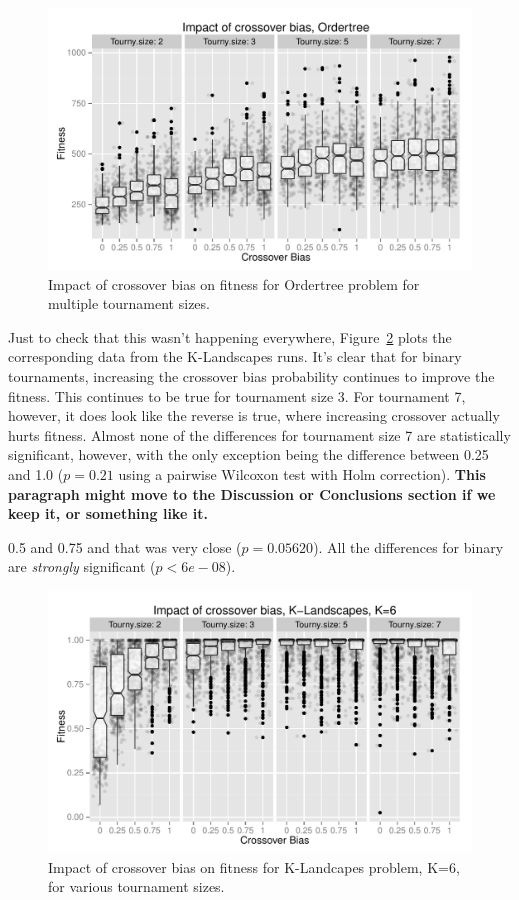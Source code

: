 \documentclass{sig-alternate}
\begin{document}
\begin{figure}
\centering
\includegraphics[width=0.45 \textwidth]{Plots/Ordertree_results_all_tournaments_Jan15.pdf}
\caption{Impact of crossover bias on fitness for Ordertree problem for multiple tournament sizes.}
\label{fig:Ordertree_results_all_tournaments_Jan15}
\end{figure}

Just to check that this wasn't happening everywhere, Figure~\ref{fig:KLandscapes6_XO_bias_impact_facets} plots 
the corresponding data from the K-Landscapes runs. It's clear that for binary tournaments, increasing the crossover 
bias probability continues to improve the fitness. This continues to be true for tournament size 3. For tournament 7, 
however, it does look like the reverse is true, where increasing crossover actually hurts fitness. Almost none of the 
differences for tournament size 7 are statistically significant, however, with the only exception being the difference 
between 0.25 and 1.0 ($p=0.21$ using a pairwise Wilcoxon test with Holm correction). \textbf{This paragraph might 
move to the Discussion or Conclusions section if we keep it, or something like it.}

0.5 and 0.75 and that was very close ($p=0.05620$). All the differences for binary are \emph{strongly} significant 
($p<6e-08$).

\begin{figure}
\centering
\includegraphics[width=0.45 \textwidth]{Plots/KLandscapes6_XO_bias_impact_facets.pdf}
\caption{Impact of crossover bias on fitness for K-Landcapes problem, K=6, for various tournament sizes.}
\label{fig:KLandscapes6_XO_bias_impact_facets}
\end{figure}
\end{document}
